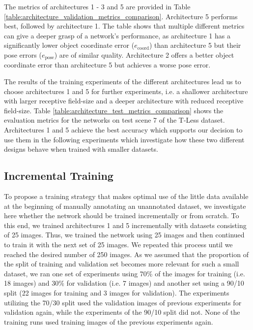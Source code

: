 The metrics of architectures 1 - 3 and 5 are provided in Table \ref{table:architecture_validation_metrics_comparison}. Architecture 5 performs best, followed by architecture 1. The table shows that multiple different metrics can give a deeper grasp of a network's performance, as architecture 1 has a significantly lower object coordinate error ($e_{\text{coord}}$) than architecture 5 but their pose errors ($e_{\text{pose}}$) are of similar quality. Architecture 2 offers a better object coordinate error than architecture 5 but achieves a worse pose error.

The results of the training experiments of the different architectures lead us to choose architectures 1 and 5 for further experiments, i.e. a shallower architecture with larger receptive field-size and a deeper architecture with reduced receptive field-size. Table \ref{table:architecture_test_metrics_comparison} shows the evaluation metrics for the networks on test scene 7 of the T-Less dataset. Architectures 1 and 5 achieve the best accuracy which supports our decision to use them in the following experiments which investigate how these two different designs behave when trained with smaller datasets.

\subsection{Incremental Training} \label{subsection:experiments_online_learning}

To propose a training strategy that makes optimal use of the little data available at the beginning of manually annotating an unannotated dataset, we investigate here whether the network should be trained incrementally or from scratch. To this end, we trained architectures 1 and 5 incrementally with datasets consisting of 25 images. Thus, we trained the network using 25 images and then continued to train it with the next set of 25 images. We repeated this process until we reached the desired number of 250 images. As we assumed that the proportion of the split of training and validation set becomes more relevant for such a small dataset, we ran one set of experiments using 70\% of the images for training (i.e. 18 images) and 30\% for validation (i.e. 7 images) and another set using a 90/10 split (22 images for training and 3 images for validation). The experiments utilizing the 70/30 split used the validation images of previous experiments for validation again, while the experiments of the 90/10 split did not. None of the training runs used training images of the previous experiments again.

